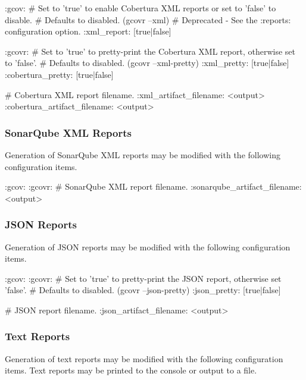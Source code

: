 \begin{DoxyCode}
:gcov:
  # Set to 'true' to enable Cobertura XML reports or set to 'false' to disable.
  # Defaults to disabled. (gcovr --xml)
  # Deprecated - See the :reports: configuration option.
  :xml\_report: [true|false]


  :gcovr:
    # Set to 'true' to pretty-print the Cobertura XML report, otherwise set to 'false'.
    # Defaults to disabled. (gcovr --xml-pretty)
    :xml\_pretty: [true|false]
    :cobertura\_pretty: [true|false]

    # Cobertura XML report filename.
    :xml\_artifact\_filename: <output>
    :cobertura\_artifact\_filename: <output>
\end{DoxyCode}


\subsubsection*{Sonar\+Qube X\+ML Reports}

Generation of Sonar\+Qube X\+ML reports may be modified with the following configuration items.


\begin{DoxyCode}
:gcov:
  :gcovr:
    # SonarQube XML report filename.
    :sonarqube\_artifact\_filename: <output>
\end{DoxyCode}


\subsubsection*{J\+S\+ON Reports}

Generation of J\+S\+ON reports may be modified with the following configuration items.


\begin{DoxyCode}
:gcov:
  :gcovr:
    # Set to 'true' to pretty-print the JSON report, otherwise set 'false'.
    # Defaults to disabled. (gcovr --json-pretty)
    :json\_pretty: [true|false]

    # JSON report filename.
    :json\_artifact\_filename: <output>
\end{DoxyCode}


\subsubsection*{Text Reports}

Generation of text reports may be modified with the following configuration items. Text reports may be printed to the console or output to a file.


